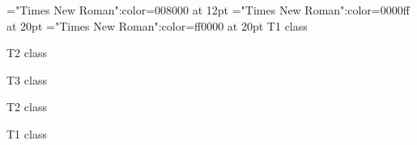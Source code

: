 \font\tctbta="Times New Roman":color=008000 at 12pt
\font\tbta="Times New Roman":color=0000ff at 20pt
\font\ta="Times New Roman":color=ff0000 at 20pt
\ta T1 class 

\tbta T2 class 

\tctbta T3 class 

\tbta T2 class 

\ta T1 class 


\bye
